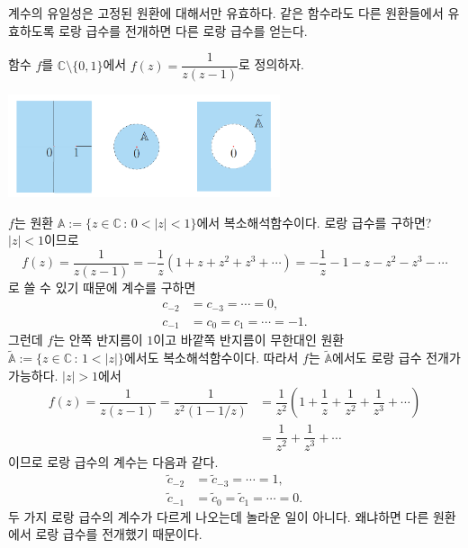 계수의 유일성은 고정된 원환에 대해서만 유효하다.
같은 함수라도 다른 원환들에서 유효하도록 로랑 급수를 전개하면
다른 로랑 급수를 얻는다.

\begin{saltexample}[label=example-4-12]{}{}

함수 $f$를 $\mathbb C\setminus\{0,1\}$에서
$f(z) = \dfrac1{z(z-1)}$로 정의하자. 

\begin{center}
\includegraphics[width=0.6\textwidth]{./SaltChapter/figs/fig-4-3}
\end{center}
\label{fig-4-3}
\saltfigskip
$f$는 원환 $\mathbb A:=\{ z\in \mathbb C\,:\, 0<|z|<1 \}$에서
복소해석함수이다. 로랑 급수를 구하면?
$|z|<1$이므로
\[
f(z) = \dfrac1{z(z-1)} %
= - \dfrac1z \left(1+z+z^2+ z^3 + \cdots \right)
= -\dfrac1z -1 -z -z^2 -z^3 - \cdots
\]
로 쓸 수 있기 때문에
계수를 구하면
\begin{align*}
c_{-2} &= c_{-3} = \cdots = 0, \\
c_{-1} & = c_0 = c_1 = \cdots = -1.
\end{align*}
그런데 $f$는 안쪽 반지름이 $1$이고 바깥쪽 반지름이 무한대인
원환 $\tilde{\mathbb A}:=\{ z\in \mathbb C\,:\, 1<|z| \}$에서도
복소해석함수이다. 따라서
$f$는 $\tilde{\mathbb A}$에서도 로랑 급수 전개가 가능하다.
$|z|>1$에서
\begin{align*}
f(z) = \dfrac1{z(z-1)} = \dfrac1{z^2(1-1/z)}
&= \dfrac1{z^2} \left( 1+ \dfrac1z + \dfrac1{z^2} + \dfrac1{z^3} + \cdots \right) \\
&= \dfrac 1{z^2} + \dfrac1{z^3} + \cdots
\end{align*}
이므로 로랑 급수의 계수는 다음과 같다.
\begin{align*}
\tilde c_{-2} &= \tilde c_{-3} = \cdots = 1, \\
\tilde c_{-1} & = \tilde c_0 = \tilde c_1 = \cdots = 0.
\end{align*}
두 가지 로랑 급수의 계수가 다르게 나오는데 놀라운 일이 아니다.
왜냐하면 다른 원환에서 로랑 급수를 전개했기 때문이다.
\end{saltexample}

